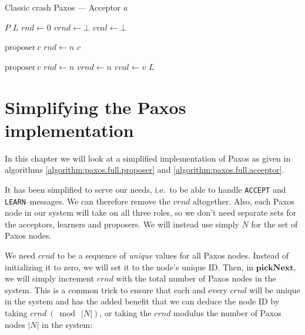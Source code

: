 \begin{algorithm}
  \caption{Classic crash Paxos --- Acceptor $a$}
  \label{algorithm:paxos.full.acceptor}
  \begin{algorithmic}
    \State $P$ 
    \State $L$ 
    \State $rnd \gets 0$ 
    \State $vrnd \gets \bot$ 
    \State $vval \gets \bot$ 
    \State

       {$\text{proposer}\ c$} 
         \State $rnd \gets n$
         \State {}
                       {$c$}
      \EndIf
    \EndOn
    \State

       {$\text{proposer}\ c$} 
        \State $rnd \gets n$
        \State $vrnd \gets n$
        \State $vval \gets v$
        \State {}
                      {$L$}
      \EndIf
    \EndOn
  \end{algorithmic}
\end{algorithm}


\section{Simplifying the Paxos implementation}
\label{ch:simplifying.paxos}

In this chapter we will look at a simplified implementation of Paxos as
given in algorithms \ref{algorithm:paxos.full.proposer} and
\ref{algorithm:paxos.full.acceptor}.

It has been simplified to serve our needs, i.e.~to be able to handle
\texttt{ACCEPT} and \texttt{LEARN}--messages.  We can therefore remove the
$vrnd$ altogether.  Also, each Paxos node in our system will take on all
three roles, so we don't need separate sets for the acceptors, learners and
proposers. We will instead use simply $N$ for the set of Paxos nodes.

We need $crnd$ to be a sequence of \textit{unique} values for all Paxos
nodes.
Instead of initializing it to zero, we will set it to the node's
unique ID.  Then, in $\textbf{pickNext}$, we will simply increment $crnd$
with the total number of Paxos nodes in the system.  This
is a common trick to ensure that each and every $crnd$ will be unique in the
system and has
the added benefit that we can deduce the node ID by taking
$crnd\ (\bmod\ |N|)$, or taking the $crnd$ modulus the number of Paxos nodes
$|N|$ in the system:

